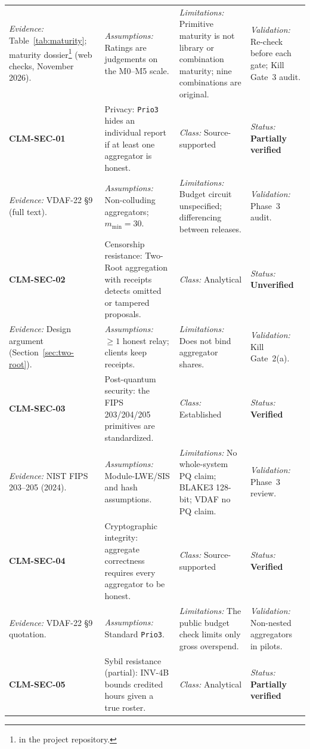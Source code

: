 \documentclass[10pt,twoside,openany]{book}
\theoremstyle{dpepstyle}
\begin{document}
{\begin{longtable}{L{0.92in} L{1.42in} L{1.07in} L{1.12in}}
\emph{Evidence:} Table~\ref{tab:maturity}; maturity dossier\footnote{ in the project repository.} (web checks, November 2026). & \emph{Assumptions:} Ratings are judgements on the M0--M5 scale. & \emph{Limitations:} Primitive maturity is not library or combination maturity; nine combinations are original. & \emph{Validation:} Re-check before each gate; Kill Gate~3 audit. \\
\addlinespace[1pt]\midrule
\textbf{CLM-SEC-01} & Privacy: \texttt{Prio3} hides an individual report if at least one aggregator is honest. & \emph{Class:} Source-supported & \emph{Status:} \textbf{Partially verified} \\*
\emph{Evidence:} VDAF-22 \S 9 (full text). & \emph{Assumptions:} Non-colluding aggregators; $m_{\min}=30$. & \emph{Limitations:} Budget circuit unspecified; differencing between releases. & \emph{Validation:} Phase~3 audit. \\
\addlinespace[1pt]\midrule
\textbf{CLM-SEC-02} & Censorship resistance: Two-Root aggregation with receipts detects omitted or tampered proposals. & \emph{Class:} Analytical & \emph{Status:} \textbf{Unverified} \\*
\emph{Evidence:} Design argument (Section~\ref{sec:two-root}). & \emph{Assumptions:} $\ge 1$ honest relay; clients keep receipts. & \emph{Limitations:} Does not bind aggregator shares. & \emph{Validation:} Kill Gate~2(a). \\
\addlinespace[1pt]\midrule
\textbf{CLM-SEC-03} & Post-quantum security: the FIPS 203/204/205 primitives are standardized. & \emph{Class:} Established & \emph{Status:} \textbf{Verified} \\*
\emph{Evidence:} NIST FIPS 203--205 (2024). & \emph{Assumptions:} Module-LWE/SIS and hash assumptions. & \emph{Limitations:} No whole-system PQ claim; BLAKE3 128-bit; VDAF no PQ claim. & \emph{Validation:} Phase~3 review. \\
\addlinespace[1pt]\midrule
\textbf{CLM-SEC-04} & Cryptographic integrity: aggregate correctness requires every aggregator to be honest. & \emph{Class:} Source-supported & \emph{Status:} \textbf{Verified} \\*
\emph{Evidence:} VDAF-22 \S 9 quotation. & \emph{Assumptions:} Standard \texttt{Prio3}. & \emph{Limitations:} The public budget check limits only gross overspend. & \emph{Validation:} Non-nested aggregators in pilots. \\
\addlinespace[1pt]\midrule
\textbf{CLM-SEC-05} & Sybil resistance (partial): INV-4B bounds credited hours given a true roster. & \emph{Class:} Analytical & \emph{Status:} \textbf{Partially verified} \\*

\end{longtable}}
\end{document}
